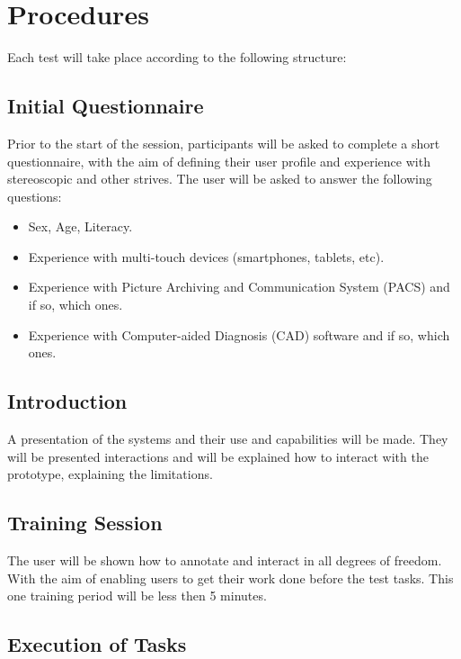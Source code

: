 \documentclass{article}
\begin{document}
\clearpage

\section{Procedures}

Each test will take place according to the following structure:

\subsection{Initial Questionnaire}

Prior to the start of the session, participants will be asked to complete a short questionnaire, with the aim of defining their user profile and experience with stereoscopic and other strives. The user will be asked to answer the following questions:

\begin{itemize}
  \item Sex, Age, Literacy.
  \item Experience with multi-touch devices (smartphones, tablets, etc).
  \item Experience with Picture Archiving and Communication System (PACS) and if so, which ones.
  \item Experience with Computer-aided Diagnosis (CAD) software and if so, which ones.
\end{itemize}

\subsection{Introduction}

A presentation of the systems and their use and capabilities will be made. They will be presented interactions and will be explained how to interact with the prototype, explaining the limitations.

\subsection{Training Session}

The user will be shown how to annotate and interact in all degrees of freedom. With the aim of enabling users to get their work done before the test tasks. This one training period will be less then 5 minutes.

\subsection{Execution of Tasks}
\end{document}
